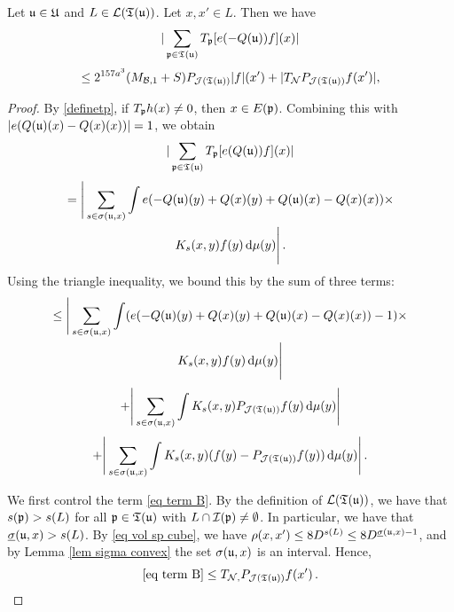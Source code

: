\begin{lemma}
    \label{TreeEstimate}
    Let $\mathfrak u \in \mathfrak U$ and $L \in \mathcal{L}(\mathfrak T(\mathfrak u))$. Let $x, x' \in L$.
    Then we have
    $$
        |\sum_{\mathfrak p \in \mathfrak T(\mathfrak u)} T_{\mathfrak p}[ e(-Q(\mathfrak u))f](x)|
    $$
    \begin{equation}
        \label{eq LJ ptwise}
        \leq 2^{157a^3}(M_{\mathcal{B},1}+S)P_{\mathcal{J}(\mathfrak T(\mathfrak u))}|f|(x')+|T_{\mathcal{N}}P_{\mathcal{J}(\mathfrak T(\mathfrak u))}f(x')|,
    \end{equation}
\end{lemma}


\begin{proof}
    By \eqref{definetp}, if $T_{\mathfrak p} h(x) \ne 0$, then $x \in E(\mathfrak p)$. Combining this with $|e(Q(\mathfrak u)(x)-Q(x)(x))| = 1$, we obtain
    $$
        |\sum_{\mathfrak p \in \mathfrak T(\mathfrak u)} T_{\mathfrak p}[ e(Q(\mathfrak u))f](x)|
    $$
    \begin{multline*}
        = \Bigg| \sum_{s \in \sigma(\mathfrak u, x)} \int e(-Q(\mathfrak u)(y) + Q(x)(y) + Q(\mathfrak u)(x) -Q(x)(x))\times\\
        K_s(x,y)f(y) \, \mathrm{d}\mu(y) \Bigg|\,.
    \end{multline*}
    Using the triangle inequality, we bound this by the sum of three terms:
    \begin{multline}
        \label{eq term A}
        \le \Bigg| \sum_{s \in \sigma(\mathfrak u, x)} \int (e(-Q(\mathfrak u)(y) + Q(x)(y) + Q(\mathfrak u)(x) -Q(x)(x))-1)\times\\
        K_s(x,y)f(y) \, \mathrm{d}\mu(y) \Bigg|
    \end{multline}
    \begin{equation}
        \label{eq term B}
        + \Bigg| \sum_{s \in \sigma(\mathfrak u, x)} \int K_s(x,y) P_{\mathcal{J}(\mathfrak T(\mathfrak u))} f(y) \, \mathrm{d}\mu(y) \Bigg|
    \end{equation}
    \begin{equation}
        \label{eq term C}
        + \Bigg| \sum_{s \in \sigma(\mathfrak u, x)} \int K_s(x,y) (f(y) - P_{\mathcal{J}(\mathfrak T(\mathfrak u))} f(y)) \, \mathrm{d}\mu(y) \Bigg|\,.
    \end{equation}

    We first control the term \eqref{eq term B}.
    By the definition of $\mathcal{L}(\mathfrak T(\mathfrak u))$, we have that $s(\mathfrak p) > s(L)$ for all $\mathfrak p \in \mathfrak T(\mathfrak u)$ with $L \cap \mathcal{I}(\mathfrak p) \ne \emptyset$. In particular, we have that $\underline{\sigma}(\mathfrak u, x) > s(L)$. By \eqref{eq vol sp cube}, we have $\rho(x,x') \le 8D^{s(L)} \le 8D^{\underline{\sigma}(\mathfrak u, x) - 1}$, and by Lemma \ref{lem sigma convex} the set $\sigma(\mathfrak u, x)$ is an interval. Hence, 
    $$
        \eqref{eq term B} \le T_{\mathcal{N}, } P_{\mathcal{J}(\mathfrak T(\mathfrak u))} f(x')\,.
    $$


\end{proof}
